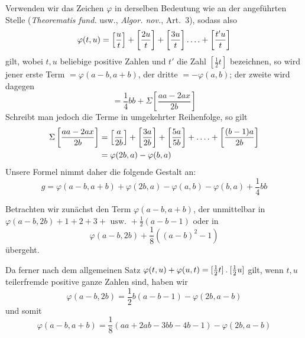 Verwenden wir das Zeichen $\varphi$ in derselben Bedeutung wie an der angeführten Stelle (\emph{Theorematis fund.} usw., \emph{Algor. nov.}, Art.~3), sodass also
\[
\varphi(t,u)=\left[\frac{u}{t}\right]+\left[\frac{2u}{t}\right]+\left[\frac{3u}{t}\right]\mathinner{.\,.\,.\,.}+\left[\frac{t'u}{t}\right]
\]
gilt, wobei $t,u$ beliebige positive Zahlen und $t'$ die Zahl $[\frac12t]$ bezeichnen, so wird jener erste Term $=\varphi(a-b,a+b)$, der dritte $=-\varphi(a,b)$; der zweite wird dagegen
%
\[
=\frac14bb+\Sigma\left[\frac{aa-2ax}{2b}\right]
\]
Schreibt man jedoch die Terme in umgekehrter Reihenfolge, so gilt
\[
\begin{aligned}
\Sigma\left[\frac{aa-2ax}{2b}\right]&=\left[\frac{a}{2b}\right]+\left[\frac{3a}{2b}\right]+\left[\frac{5a}{5b}\right]+\mathinner{.\,.\,.\,.}+\left[\frac{(b-1)a}{2b}\right]\\
&=\varphi(2b,a)-\varphi(b,a)
\end{aligned}
\]
Unsere Formel nimmt daher die folgende Gestalt an:
\[
g=\varphi(a-b,a+b)+\varphi(2b,a)-\varphi(a,b)-\varphi(b,a)+\frac14bb
\]

Betrachten wir zunächst den Term $\varphi(a-b,a+b)$, der unmittelbar in $\varphi(a-b,2b)+1+2+3+\text{ usw. }+\frac12(a-b-1)$ oder in
\[
\varphi(a-b,2b)+\frac18((a-b)^2-1)
\]
übergeht.

Da ferner nach dem allgemeinen Satz $\varphi(t,u)+\varphi(u,t)=[\frac12t]\mathbin{.}[\frac12u]$ gilt, wenn $t,u$ teilerfremde positive ganze Zahlen sind, haben wir
\[
\varphi(a-b,2b)=\frac12b(a-b-1)-\varphi(2b,a-b)
\]
und somit
\[
\varphi(a-b,a+b)=\frac18(aa+2ab-3bb-4b-1)-\varphi(2b,a-b)
\]


